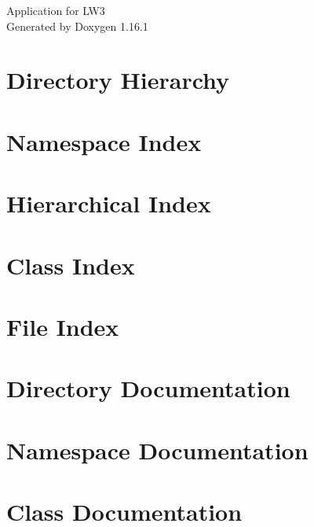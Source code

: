 \documentclass[twoside]{book}
\newcommand{\+}{\discretionary{\mbox{\scriptsize$\hookleftarrow$}}{}{}}
\newcommand{\clearemptydoublepage}{%
    \newpage{\pagestyle{empty}\cleardoublepage}%
  }
\begin{document}
  \raggedbottom
    \hypersetup{pageanchor=false,
                bookmarksnumbered=true,
                pdfencoding=unicode
               }
  \begin{titlepage}
  \vspace*{7cm}
  \begin{center}%
  {\Large Application for LW3}\\
  \vspace*{1cm}
  {\large Generated by Doxygen 1.16.1}\\
  \end{center}
  \end{titlepage}
  \clearemptydoublepage
  \tableofcontents
  \clearemptydoublepage
  \hypersetup{pageanchor=true}
\chapter{Directory Hierarchy}

\chapter{Namespace Index}

\chapter{Hierarchical Index}

\chapter{Class Index}

\chapter{File Index}

\chapter{Directory Documentation}

\chapter{Namespace Documentation}

\chapter{Class Documentation}





\end{document}
